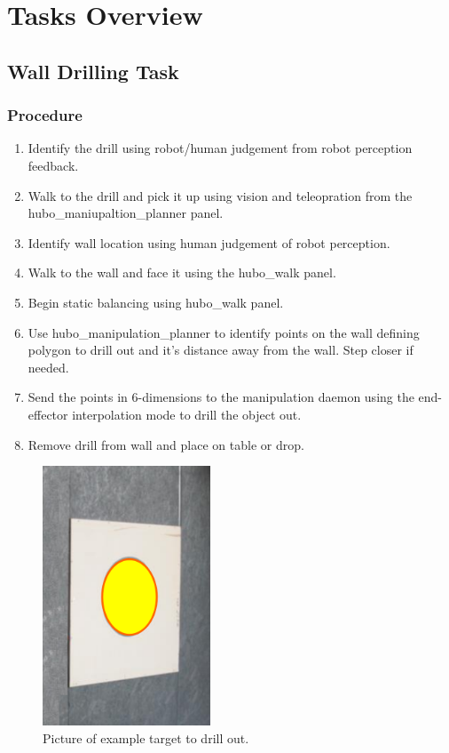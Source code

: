 \documentclass[letterpaper, 10 pt]{report}
\begin{document}
%
\chapter{Tasks Overview}
\section{Wall Drilling Task}\label{wall-drilling-task}

\subsection{Procedure}
\begin{enumerate}
\item Identify the drill using robot/human judgement from robot perception feedback.
\item Walk to the drill and pick it up using vision and teleopration from the hubo\_maniupaltion\_planner panel.
\item Identify wall location using human judgement of robot perception.
\item Walk to the wall and face it using the hubo\_walk panel.
\item Begin static balancing using hubo\_walk panel.
\item Use hubo\_manipulation\_planner to identify points on the wall defining polygon to drill out and it's distance away from the wall. Step closer if needed.
\item Send the points in 6-dimensions to the manipulation daemon using the end-effector interpolation mode to drill the object out.
\item Remove drill from wall and place on table or drop.
\end{enumerate}
\begin{figure}[ht]
  \centering
  \includegraphics[width=5.0cm]{figures/wall-drilling}
  \caption{Picture of example target to drill out.}
  \label{fig:Wall-image}
\end{figure}
\end{document}
